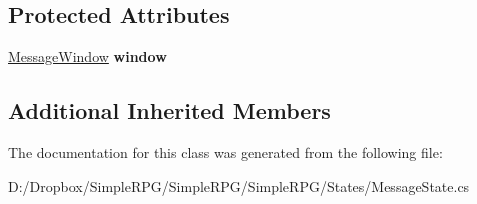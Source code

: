 \subsection*{Protected Attributes}
\begin{DoxyCompactItemize}
\item 
\hypertarget{class_simple_r_p_g_1_1_states_1_1_message_state_ae73420c7b3446e1db21cf6bb14861358}{\hyperlink{class_simple_r_p_g_1_1_windows_1_1_message_window}{Message\+Window} {\bfseries window}}\label{class_simple_r_p_g_1_1_states_1_1_message_state_ae73420c7b3446e1db21cf6bb14861358}

\end{DoxyCompactItemize}
\subsection*{Additional Inherited Members}


The documentation for this class was generated from the following file\+:\begin{DoxyCompactItemize}
\item 
D\+:/\+Dropbox/\+Simple\+R\+P\+G/\+Simple\+R\+P\+G/\+Simple\+R\+P\+G/\+States/Message\+State.\+cs\end{DoxyCompactItemize}
